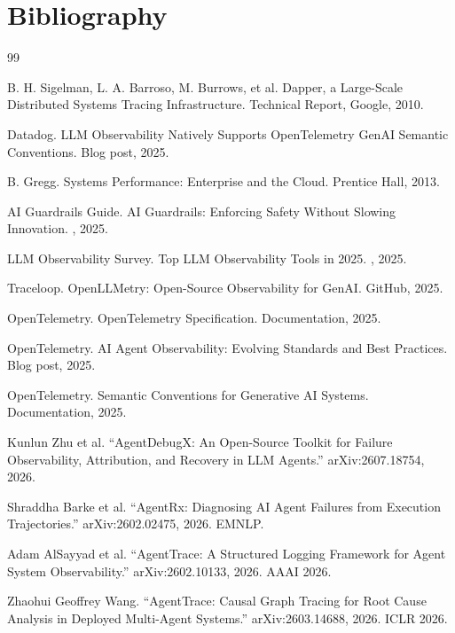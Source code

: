 \section*{Bibliography}

\begin{thebibliography}{99}

B. H. Sigelman, L. A. Barroso, M. Burrows, et al.
\newblock Dapper, a Large-Scale Distributed Systems Tracing Infrastructure.
\newblock Technical Report, Google, 2010.

Datadog.
\newblock LLM Observability Natively Supports OpenTelemetry GenAI Semantic Conventions.
\newblock Blog post, 2025.

B. Gregg.
\newblock Systems Performance: Enterprise and the Cloud.
\newblock Prentice Hall, 2013.

AI Guardrails Guide.
\newblock AI Guardrails: Enforcing Safety Without Slowing Innovation.
, 2025.

LLM Observability Survey.
\newblock Top LLM Observability Tools in 2025.
, 2025.

Traceloop.
\newblock OpenLLMetry: Open-Source Observability for GenAI.
\newblock GitHub, 2025.

OpenTelemetry.
\newblock OpenTelemetry Specification.
\newblock Documentation, 2025.

OpenTelemetry.
\newblock AI Agent Observability: Evolving Standards and Best Practices.
\newblock Blog post, 2025.

OpenTelemetry.
\newblock Semantic Conventions for Generative AI Systems.
\newblock Documentation, 2025.


Kunlun Zhu et al.
``AgentDebugX: An Open-Source Toolkit for Failure Observability, Attribution, and Recovery in LLM Agents.''
arXiv:2607.18754, 2026.

Shraddha Barke et al.
``AgentRx: Diagnosing AI Agent Failures from Execution Trajectories.''
arXiv:2602.02475, 2026. EMNLP.

Adam AlSayyad et al.
``AgentTrace: A Structured Logging Framework for Agent System Observability.''
arXiv:2602.10133, 2026. AAAI 2026.

Zhaohui Geoffrey Wang.
``AgentTrace: Causal Graph Tracing for Root Cause Analysis in Deployed Multi-Agent Systems.''
arXiv:2603.14688, 2026. ICLR 2026.


\end{thebibliography}
